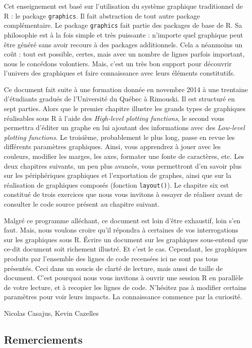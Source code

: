 \documentclass[]{article}
\begin{document}
Cet enseignement est basé sur l'utilisation du système graphique traditionnel de R : le package \texttt{graphics}. Il fait abstraction de tout autre package complémentaire. Le package \texttt{graphics} fait partie des packages de base de R. Sa philosophie est à la fois simple et très puissante : n'importe quel graphique peut être généré sans avoir recours à des packages additionnels. Cela a néanmoins un coût : tout est possible, certes, mais avec un nombre de lignes parfois important, nous le concédons volontiers. Mais, c'est un très bon support pour découvrir l'univers des graphiques et faire connaissance avec leurs éléments constitutifs.

Ce document fait suite à une formation donnée en novembre 2014 à une trentaine d'étudiants gradués de l'Université du Québec à Rimouski. Il est structuré en sept parties. Alors que le premier chapitre illustre les grands types de graphiques réalisables sous R à l'aide des \emph{High-level plotting functions}, le second vous permettra d'éditer un graphe en lui ajoutant des informations avec des \emph{Low-level plotting functions}. Le troisième, probablement le plus long, passe en revue les différents paramètres graphiques. Ainsi, vous apprendrez à jouer avec les couleurs, modifier les marges, les axes, formater une fonte de caractères, etc. Les deux chapitres suivants, un peu plus avancés, vous permettront d'en savoir plus sur les périphériques graphiques et l'exportation de graphes, ainsi que sur la réalisation de graphiques composés (fonction \texttt{layout()}). Le chapitre six est constitué de trois exercices que nous vous invitons à essayer de réaliser avant de consulter le code source présent au chapitre suivant.

Malgré ce programme alléchant, ce document est loin d'être exhaustif, loin s'en faut. Mais, nous voulons croire qu'il répondra à certaines de vos interrogations sur les graphiques sous R. Écrire un document sur les graphiques sous-entend que ce-dit document soit richement illustré. Et c'est le cas. Cependant, les graphiques produits par l'ensemble des lignes de code recensées ici ne sont pas tous présentés. Ceci dans un soucis de clarté de lecture, mais aussi de taille de document. C'est pourquoi nous vous invitons à ouvrir une session R en parallèle de votre lecture, et à recopier les lignes de code. N'hésitez pas à modifier certains paramètres pour voir leurs impacts. La connaissance commence par la curiosité.

Nicolas Casajus, Kevin Cazelles

\hypertarget{remerciements}{%
\subsection*{Remerciements}\label{remerciements}}
\end{document}
